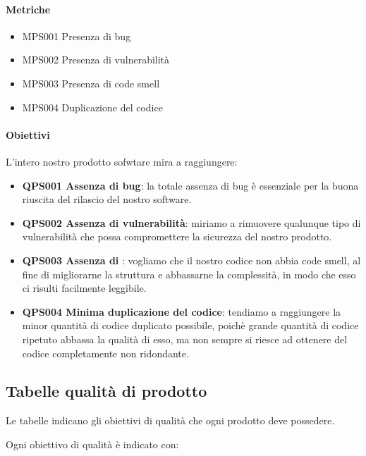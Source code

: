 		\paragraph*{Metriche} 
		\begin{itemize}
			\item MPS001 Presenza di bug
			\item MPS002 Presenza di vulnerabilità
			\item MPS003 Presenza di code smell
			\item MPS004 Duplicazione del codice
		\end{itemize} 

		\paragraph*{Obiettivi} 	
		L'intero nostro prodotto sofwtare mira a raggiungere:
		\begin{itemize}
			\item \textbf{QPS001 Assenza di bug}: la totale assenza di bug è essenziale per la buona riuscita del rilascio del nostro software.
			\item \textbf{QPS002 Assenza di vulnerabilità}: miriamo a rimuovere qualunque tipo di vulnerabilità che possa compromettere la sicurezza del nostro prodotto.
			\item \textbf{QPS003 Assenza di }: vogliamo che il nostro codice non abbia code smell, al fine di migliorarne la struttura e abbassarne la complessità, in modo che esso ci risulti facilmente leggibile.
			\item \textbf{QPS004 Minima duplicazione del codice}: tendiamo a raggiungere la minor quantità di codice duplicato possibile, poichè grande quantità di codice ripetuto abbassa la qualità di esso, ma non sempre si riesce ad ottenere del codice completamente non ridondante.
		\end{itemize}


\subsection{Tabelle qualità di prodotto} \label{tabellequalitaprodotto}
Le tabelle indicano gli obiettivi di qualità che ogni prodotto deve possedere.

Ogni obiettivo di qualità è indicato con:

